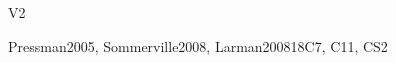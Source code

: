 \begin{syllabus}
\begin{competences}{V2}
      \item {} 
      \item {}
      \item {}
      \item {}
      \item {}
      \item {}
\end{competences}

\begin{unit}{\SERequirementsEngineering}{}{Pressman2005, Sommerville2008, Larman2008}{18}{C7, C11, CS2} 
\begin{topics}
    \item \SERequirementsEngineeringTopicDescribing
    \item \SERequirementsEngineeringTopicProperties
    \item \SERequirementsEngineeringTopicSoftwareRequirements
    \item \SERequirementsEngineeringTopicDescribingSystem
    \item \SERequirementsEngineeringTopicNon
    \item \SERequirementsEngineeringTopicEvaluation
    \item \SERequirementsEngineeringTopicRequirements
    \item \SERequirementsEngineeringTopicAcceptability
    \item \SERequirementsEngineeringTopicPrototyping
    \item \SERequirementsEngineeringTopicBasic
    \item \SERequirementsEngineeringTopicRequirementsSpecification
    \item \SERequirementsEngineeringTopicRequirementsValidation
    \item \SERequirementsEngineeringTopicRequirementsTracing
\end{topics}
 

\end{unit}
\end{syllabus}

